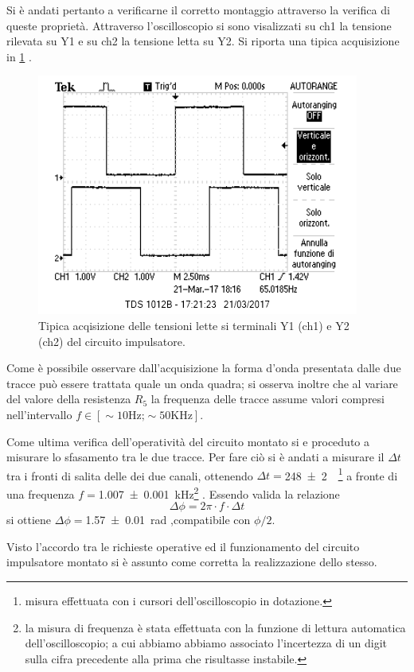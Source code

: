 	Si è andati pertanto a verificarne il corretto montaggio attraverso la verifica di queste proprietà.
	Attraverso l'oscilloscopio si sono visalizzati su ch1 la tensione rilevata su Y1 e su  ch2 la tensione letta su Y2. Si riporta una tipica acquisizione in 
	\figurename{ \ref{f:oscil} }.
	\begin{figure}[htb]
		\includegraphics[scale=0.50]{../Figs-Tabs/ondaquadra_esempio.png}
		\caption{Tipica acqisizione delle tensioni lette si terminali Y1 (ch1) e Y2 (ch2) del circuito impulsatore.}
		\label{f:oscil}
	\end{figure}

	Come è possibile osservare dall'acquisizione la forma d'onda presentata dalle due tracce può essere trattata quale un onda quadra; si osserva inoltre che al variare del valore della resistenza $R_{5}$ la frequenza delle tracce assume valori compresi nell'intervallo $f\in [\sim 10 \text{Hz;} \sim 50 \text{KHz}]$.
	
	Come ultima verifica dell'operatività del circuito montato si e proceduto a misurare lo sfasamento tra le due tracce.
	Per fare ciò si è andati a misurare il $\Delta t$ tra i fronti di salita delle dei due canali, ottenendo $\Delta t=$\SI{248 \pm 2}{\mu \sec}\footnote{misura effettuata con i cursori dell'oscilloscopio in dotazione.} a fronte di una frequenza
	  $f=$\SI{1.007 \pm 0.001}{\kilo \hertz}\footnote{la misura di frequenza è stata effettuata con la funzione di lettura automatica dell'oscilloscopio; a cui abbiamo abbiamo associato l'incertezza di un digit sulla cifra precedente alla prima che risultasse instabile. } .
	Essendo valida la relazione \begin{equation}
	\Delta \phi = 2 \pi \cdot f \cdot \Delta t
	\end{equation}\label{eq:sfas}
	si ottiene $\Delta \phi=$\SI{1.57 \pm 0.01 }{\radian} ,compatibile con $\phi/2$.
	
	Visto l'accordo tra le richieste operative ed il funzionamento del circuito impulsatore montato 
	si è assunto  come  corretta la realizzazione dello stesso.
	
